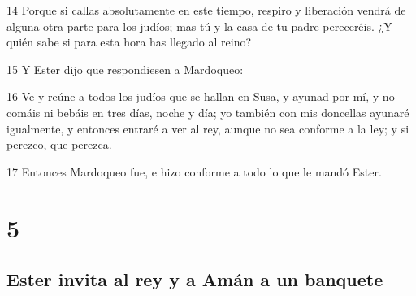 \par 14 Porque si callas absolutamente en este tiempo, respiro y liberación vendrá de alguna otra parte para los judíos; mas tú y la casa de tu padre pereceréis. ¿Y quién sabe si para esta hora has llegado al reino?
\par 15 Y Ester dijo que respondiesen a Mardoqueo:
\par 16 Ve y reúne a todos los judíos que se hallan en Susa, y ayunad por mí, y no comáis ni bebáis en tres días, noche y día; yo también con mis doncellas ayunaré igualmente, y entonces entraré a ver al rey, aunque no sea conforme a la ley; y si perezco, que perezca.
\par 17 Entonces Mardoqueo fue, e hizo conforme a todo lo que le mandó Ester.

\chapter{5}

\section*{Ester invita al rey y a Amán a un banquete}

